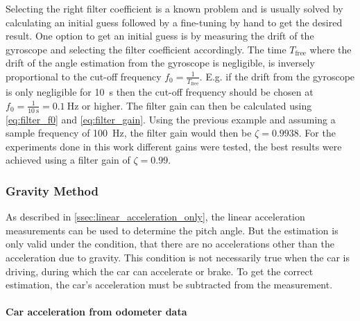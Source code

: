 Selecting the right filter coefficient is a known problem and is usually solved by calculating an initial guess followed by a fine-tuning by hand to get the desired result.
One option to get an initial guess is by measuring the drift of the gyroscope and selecting the filter coefficient accordingly.
The time $T_\mathrm{free}$ where the drift of the angle estimation from the gyroscope is negligible, is inversely proportional to the cut-off frequency $f_0 = \frac{1}{T_\mathrm{free}}$.
E.g. if the drift from the gyroscope is only negligible for \SI{10}{\second} then the cut-off frequency should be chosen at $f_0 = \frac{1}{\SI{10}{\second}} = \SI{0.1}{\hertz}$ or higher.
The filter gain can then be calculated using \cref{eq:filter_f0} and \cref{eq:filter_gain}.
Using the previous example and assuming a sample frequency of \SI{100}{\hertz}, the filter gain would then be $\zeta = 0.9938$.
For the experiments done in this work different gains were tested, the best results were achieved using a filter gain of $\zeta = 0.99$.

\subsubsection{Gravity Method}
\label{subsubsec:gravity_method}
As described in \cref{ssec:linear_acceleration_only}, the linear acceleration measurements can be used to determine the pitch angle.
But the estimation is only valid under the condition, that there are no accelerations other than the acceleration due to gravity.
This condition is not necessarily true when the car is driving, during which the car can accelerate or brake.
To get the correct estimation, the car's acceleration must be subtracted from the measurement.

\paragraph{Car acceleration from odometer data}\mbox{}
\label{para:acc_from_odom}

